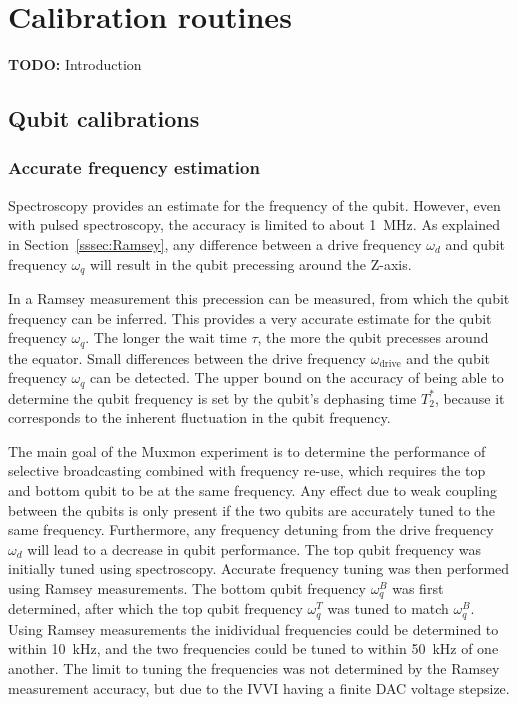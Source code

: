  \chapter{Calibration routines}
    \label{ch:Calibration routines}
    \textbf{TODO:} Introduction

    \section{Qubit calibrations}
      \label{Qubit calibrations}

      \subsection{Accurate frequency estimation}
        \label{ssec:Accurate frequency estimation}
        Spectroscopy provides an estimate for the frequency of the qubit. However, even with pulsed spectroscopy, the accuracy is limited to about \SI{1}{\mega \hertz}. As explained in Section~\ref{sssec:Ramsey}, any difference between a drive frequency $\omega_d$ and qubit frequency $\omega_q$ will result in the qubit precessing around the Z-axis.

        In a Ramsey measurement this precession can be measured, from which the qubit frequency can be inferred. This provides a very accurate estimate for the qubit frequency $\omega_q$. The longer the wait time $\tau$, the more the qubit precesses around the equator. Small differences between the drive frequency $\omega_\text{drive}$ and the qubit frequency $\omega_q$ can be detected. The upper bound on the accuracy of being able to determine the qubit frequency is set by the qubit's dephasing time $T_2^*$, because it corresponds to the inherent fluctuation in the qubit frequency.

        The main goal of the Muxmon experiment is to determine the performance of selective broadcasting combined with frequency re-use, which requires the top and bottom qubit to be at the same frequency. Any effect due to weak coupling between the qubits is only present if the two qubits are accurately tuned to the same frequency. Furthermore, any frequency detuning from the drive frequency $\omega_d$ will lead to a decrease in qubit performance. The top qubit frequency was initially tuned using spectroscopy. Accurate frequency tuning was then performed using Ramsey measurements. The bottom qubit frequency $\omega_q^B$ was first determined, after which the top qubit frequency $\omega_q^T$  was tuned to match $\omega_q^B$. Using Ramsey measurements the inidividual frequencies could be determined to within \SI{10}{\kilo \hertz}, and the two frequencies could be tuned to within \SI{50}{\kilo \hertz} of one another. The limit to tuning the frequencies was not determined by the Ramsey measurement accuracy, but due to the IVVI having a finite DAC voltage stepsize.

